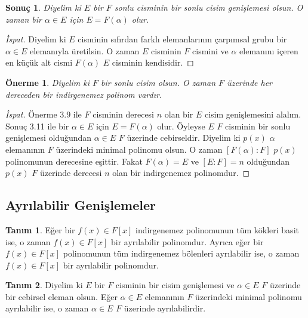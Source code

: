 \documentclass[draft]{article}
\newtheorem{cor}[thm]{Sonuç}
\newtheorem{prop}[thm]{Önerme}
\theoremstyle{definition}
\newtheorem{defn}{Tanım}[section]
\theoremstyle{remark}
\begin{document}
    	    \begin{cor}
    	        Diyelim ki $E$ bir $F$ sonlu cisminin bir sonlu cisim genişlemesi olsun. O zaman bir $\alpha \in E$ için $E = F(\alpha)$ olur.
    	    \end{cor}
    	    
    	    \begin{proof}[İspat]
    	        Diyelim ki $E$ cisminin sıfırdan farklı elemanlarının çarpımsal grubu bir $\alpha \in E$ elemanıyla üretilsin. O zaman $E$ cisminin $F$ cismini ve $\alpha$ elemanını içeren en küçük alt cismi $F(\alpha)$ $E$ cisminin kendisidir.
    	    \end{proof}
    	    
    	    \begin{prop}
    	        Diyelim ki $F$ bir sonlu cisim olsun. O zaman $F$ üzerinde her dereceden bir indirgenemez polinom vardır.
    	    \end{prop}
    	    
    	    \begin{proof}[İspat]
    	        Önerme 3.9 ile $F$ cisminin derecesi $n$ olan bir $E$ cisim genişlemesini alalım. Sonuç 3.11 ile bir $\alpha \in E$ için $E = F(\alpha)$ olur. Öyleyse $E$ $F$ cisminin bir sonlu genişlemesi olduğundan $\alpha \in E$ $F$ üzerinde cebirseldir. Diyelim ki $p(x)$ $\alpha$ elemanının $F$ üzerindeki minimal polinomu olsun. O zaman $[F(\alpha) : F]$ $p(x)$ polinomunun derecesine eşittir. Fakat $F(\alpha) = E$ ve $[E : F] = n$ olduğundan $p(x)$ $F$ üzerinde derecesi $n$ olan bir indirgenemez polinomdur.
    	    \end{proof}
	        
    	\subsection{Ayrılabilir Genişlemeler}
    	
    	    \begin{defn}
    	        Eğer bir $f(x) \in F[x]$ indirgenemez polinomunun tüm kökleri basit ise, o zaman $f(x) \in F[x]$ bir ayrılabilir polinomdur. Ayrıca eğer bir $f(x) \in F[x]$ polinomunun tüm indirgenemez bölenleri ayrılabilir ise, o zaman $f(x) \in F[x]$ bir ayrılabilir polinomdur.
    	    \end{defn}
    	    
    	    \begin{defn}
    	        Diyelim ki $E$ bir $F$ cisminin bir cisim genişlemesi ve $\alpha \in E$ $F$ üzerinde bir cebirsel eleman olsun. Eğer $\alpha \in E$ elemanının $F$ üzerindeki minimal polinomu ayrılabilir ise, o zaman $\alpha \in E$ $F$ üzerinde ayrılabilirdir.
    	    \end{defn}
    	    
\end{document}
